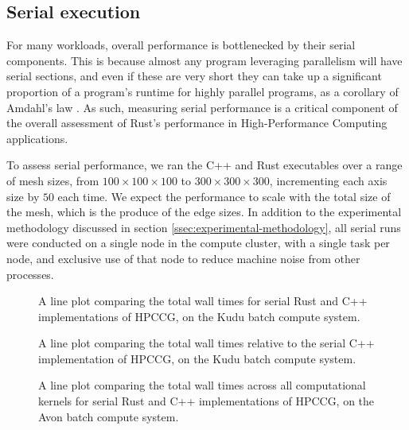 \subsection{Serial execution}
\label{ssec:serial-execution}

For many workloads, overall performance is bottlenecked by their serial components. This is because almost any program leveraging parallelism will have serial sections, and even if these are very short they can take up a significant proportion of a program's runtime for highly parallel programs, as a corollary of Amdahl's law \cite{amdahlsLaw}. As such, measuring serial performance is a critical component of the overall assessment of Rust's performance in High-Performance Computing applications.

To assess serial performance, we ran the C++ and Rust executables over a range of mesh sizes, from $100 \times 100 \times 100$ to $300 \times 300 \times 300$, incrementing each axis size by $50$ each time. We expect the performance to scale with the total size of the mesh, which is the produce of the edge sizes. In addition to the experimental methodology discussed in section \ref{ssec:experimental-methodology}, all serial runs were conducted on a single node in the compute cluster, with a single task per node, and exclusive use of that node to reduce machine noise from other processes.

\begin{figure}[H]
    \centering
    
    \caption{A line plot comparing the total wall times for serial Rust and C++ implementations of HPCCG, on the Kudu batch compute system.}
    \label{fig:1_serial_line}
\end{figure}

\begin{figure}[H]
    \centering
    
    \caption{A line plot comparing the total wall times relative to the serial C++ implementation of HPCCG, on the Kudu batch compute system.}
    \label{fig:2_serial_line_relative}
\end{figure}

\begin{figure}[H]
    \centering
    
    \caption{A line plot comparing the total wall times across all computational kernels for serial Rust and C++ implementations of HPCCG, on the Avon batch compute system.}
    \label{fig:1_serial_line_avon}
\end{figure}

